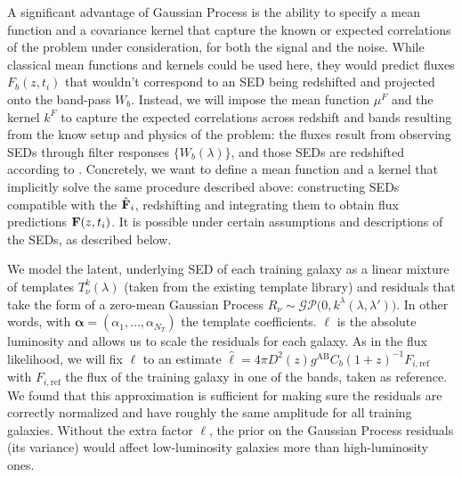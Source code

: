 \documentclass[aps,prd,showpacs,superscriptaddress,groupedaddress]{revtex4}  %
\begin{document}
A significant advantage of Gaussian Process is the ability to specify a mean function and a covariance kernel that capture the known or expected correlations of the problem under consideration, for both the signal and the noise.
While classical mean functions and kernels could be used here, they would predict fluxes $F_b(z, t_i)$ that wouldn't correspond to an SED being redshifted and projected onto the band-pass $W_b$.
Instead, we will impose the mean function $\mu^F$ and the kernel $k^F$ to capture the expected correlations across redshift and bands resulting from the know setup and physics of the problem: the fluxes result from observing SEDs through filter responses $\{ W_b(\lambda)\}$, and those SEDs are redshifted according to .  
Concretely, we want to define a mean function and a kernel that implicitly solve the same procedure described above: constructing SEDs compatible with the $\hat{\mat{F}}_i$, redshifting and integrating them to obtain flux predictions $\mat{F}(z, t_i)$. 
It is possible under certain assumptions and descriptions of the SEDs, as described below.

We model the latent, underlying SED of each training galaxy as a linear mixture of templates $T^k_\nu(\lambda)$ (taken from the existing template library) and residuals that take the form of a zero-mean Gaussian Process $R_\nu \sim \mathcal{GP}\bigl(0, k^\lambda(\lambda,\lambda') \bigr)$. In other words,
with $\bm{\alpha}=(\alpha_1, \dots, \alpha_{N_T})$ the template coefficients. 
$\ell$ is the absolute luminosity and allows us to scale the residuals for each galaxy. 
As in the flux likelihood, we will fix $\ell$ to an estimate $\hat{\ell} = 4\pi D^2(z) g^\mathrm{AB} C_b (1+z)^{-1} F_{i, \mathrm{ref}}$ with $F_{i, \mathrm{ref}}$ the flux of the training galaxy in one of the bands, taken as reference.
We found that this approximation is sufficient for making sure the residuals are correctly normalized and have roughly the same amplitude for all training galaxies. 
Without the extra factor $\ell$, the prior on the Gaussian Process residuals (\eg its variance) would affect low-luminosity galaxies more than high-luminosity ones.
\end{document}
